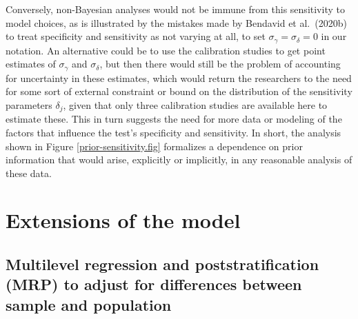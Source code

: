 \documentclass[11pt]{article}
\begin{document}
Conversely, non-Bayesian analyses would not be immune from this
sensitivity to model choices, as is illustrated by the mistakes made
by Bendavid et al.\ (2020b) to treat specificity and sensitivity as
not varying at all, to set $\sigma_{\gamma}=\sigma_{\delta}=0$ in our
notation.  An alternative could be to use the calibration studies to
get point estimates of $\sigma_{\gamma}$ and $\sigma_{\delta}$, but
then there would still be the problem of accounting for uncertainty in
these estimates, which would return the researchers to the need for
some sort of external constraint or bound on the distribution of the
sensitivity parameters $\delta_j$, given that only three calibration
studies are available here to estimate these.  This in turn suggests
the need for more data or modeling of the factors that influence the
test's specificity and sensitivity.  In short, the analysis shown in
Figure \ref{prior-sensitivity.fig} formalizes a dependence on prior
information that would arise, explicitly or implicitly, in any
reasonable analysis of these data.

\section{Extensions of the model}

\subsection{Multilevel regression and poststratification (MRP) to adjust for differences between sample and population}\label{mrp}
\end{document}
